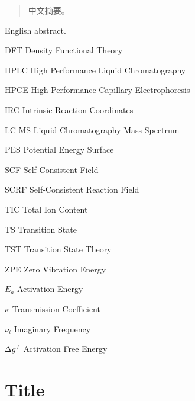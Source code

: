 \documentclass[degree=doctor,language=english]{sysuthesis}
\begin{document}
\START
\showoutput

\begin{committee}
\end{committee}

\frontmatter

\begin{abstract}
  中文摘要。
\end{abstract}

\begin{abstract*}
  English abstract.
\end{abstract*}

\tableofcontents

\listoffiguresandtables

\begin{denotation}
  \item[DFT] Density Functional Theory
  \item[HPLC] High Performance Liquid Chromatography
  \item[HPCE] High Performance Capillary Electrophoresis
  \item[IRC] Intrinsic Reaction Coordinates
  \item[LC-MS] Liquid Chromatography-Mass Spectrum
  \item[PES] Potential Energy Surface
  \item[SCF] Self-Consistent Field
  \item[SCRF] Self-Consistent Reaction Field
  \item[TIC] Total Ion Content
  \item[TS] Transition State
  \item[TST] Transition State Theory
  \item[ZPE] Zero Vibration Energy
  \item[$E_a$] Activation Energy
  \item[$\kappa$] Transmission Coefficient
  \item[$\nu_i$] Imaginary Frequency
  \item[$\increment g^\neq$] Activation Free Energy
\end{denotation}

\mainmatter

\chapter{Title}
\end{document}
